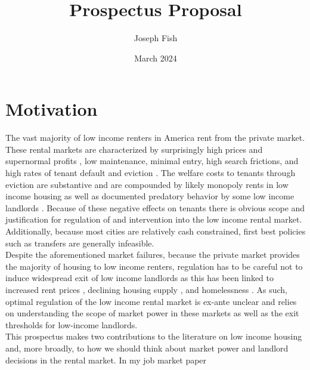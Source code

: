 \documentclass{article}
\title{Prospectus Proposal}
\author{Joseph Fish}
\date{March 2024}
\begin{document}
\section{Motivation}

The vast majority of low income renters in America rent from the private market. These rental markets are characterized by surprisingly high prices and supernormal profits \parencite{Desmond_2019, Damen_2025,Eisfeldt_2015}, low maintenance, minimal entry, high search frictions, and high rates of tenant default \parencite{humphries-2024} and eviction \parencite{Gromis-et-al-2022}. The welfare costs to tenants through eviction are substantive \parencite{collison-et-al-2023, graetz-at-al-2023} and are compounded by likely monopoly rents in low income housing as well as documented predatory behavior by some low income landlords \parencite{desmond-evicted}. Because of these negative effects on tenants there is obvious scope and justification for regulation of and intervention into the low income rental market. Additionally, because most cities are relatively cash constrained, first best policies such as transfers are generally infeasible.\\

Despite the aforementioned market failures, because the private market provides the majority of housing to low income renters, regulation has to be careful not to induce widespread exit of low income landlords as this has been linked to increased rent prices \parencite{collinson2024eviction}, declining housing supply \parencite{diamond-2019}, and homelessness \parencite{pinto2024sro}. As such, optimal regulation of the low income rental market is ex-ante unclear and relies on understanding the scope of market power in these markets as well as the exit thresholds for low-income landlords.\\   

This prospectus makes two contributions to the literature on low income housing and, more broadly, to how we should think about market power and landlord decisions in the rental market. In my job market paper

\end{document}
